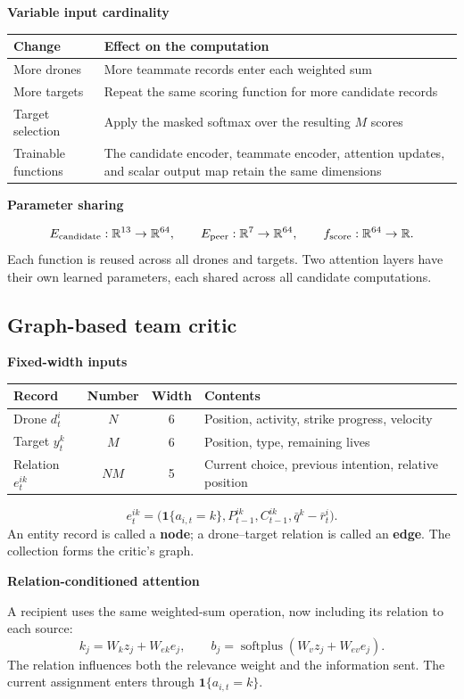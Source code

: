 \documentclass[11pt,a4paper]{article}
\newcommand{\ind}{\mathbf 1}
\newcommand{\R}{\mathbb R}
\newcommand{\lead}[1]{\medskip\textbf{#1}\par}
\begin{document}
\lead{Variable input cardinality}
\begin{center}
\begin{tabularx}{\linewidth}{@{}lX@{}}
\toprule
Change & Effect on the computation \\
\midrule
More drones & More teammate records enter each weighted sum \\
More targets & Repeat the same scoring function for more candidate records \\
Target selection & Apply the masked softmax over the resulting $M$ scores \\
Trainable functions & The candidate encoder, teammate encoder, attention updates, and scalar output map retain the same dimensions \\
\bottomrule
\end{tabularx}
\end{center}

\lead{Parameter sharing}
\[
E_{\rm candidate}:\R^{13}\to\R^{64},\qquad
E_{\rm peer}:\R^7\to\R^{64},\qquad
f_{\rm score}:\R^{64}\to\R.
\]
Each function is reused across all drones and targets. Two attention layers
have their own learned parameters, each shared across all candidate computations.

\newpage
\subsection{Graph-based team critic}
\lead{Fixed-width inputs}
\begin{center}
\begin{tabularx}{\linewidth}{@{}lccX@{}}
\toprule
Record & Number & Width & Contents \\
\midrule
Drone $d_t^i$ & $N$ & 6 & Position, activity, strike progress, velocity \\
Target $y_t^k$ & $M$ & 6 & Position, type, remaining lives \\
Relation $e_t^{ik}$ & $NM$ & 5 & Current choice, previous intention, relative position \\
\bottomrule
\end{tabularx}
\end{center}
\[
e_t^{ik}=\bigl(\ind\{a_{i,t}=k\},P_{t-1}^{ik},C_{t-1}^{ik},\bar q^k-\bar r_t^i\bigr).
\]
An entity record is called a \textbf{node}; a drone--target relation is called
an \textbf{edge}. The collection forms the critic's graph.

\lead{Relation-conditioned attention}
A recipient uses the same weighted-sum operation, now including its relation to each source:
\[
k_j=W_kz_j+W_{ek}e_j,\qquad
b_j=\operatorname{softplus}(W_vz_j+W_{ev}e_j).
\]
The relation influences both the relevance weight and the information sent.
The current assignment enters through $\ind\{a_{i,t}=k\}$.
\end{document}
